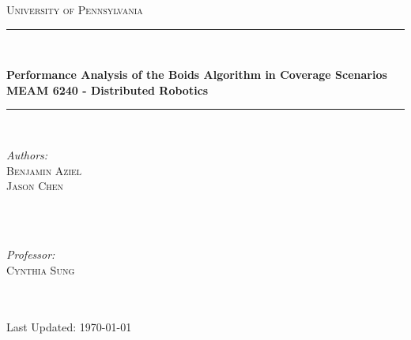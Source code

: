 \documentclass[12pt]{article}
\begin{document}

\thispagestyle{empty}
\newcommand{\titleName}{Performance Analysis of the Boids Algorithm in Coverage Scenarios\\[.4cm]
\textmd{\LARGE MEAM 6240 - Distributed Robotics}}
\begin{titlepage} 
	\newcommand{\HRule}{\rule{\linewidth}{0.5mm}}
	\center
	\textsc{\LARGE University of Pennsylvania}\\[2.5cm] 
	{\color{black} \HRule\\[0.4cm]}
	{\huge\bfseries \titleName}\\[0.4cm] 
	{\color{black} \HRule\\[0.4cm]}
	\begin{minipage}{0.4\textwidth}
		\begin{flushleft}
			\large
			\textit{Authors:}\\
            \textsc{Benjamin Aziel} \\
            \textsc{Jason Chen}\\
            \text{ }\\
		\end{flushleft}
	\end{minipage}
	~
	\begin{minipage}{0.4\textwidth}
		\begin{flushright}
			\large
			\textit{Professor:}\\
			\textsc{Cynthia Sung}\\ 
            \text{ }\\
            \text{ }\\
		\end{flushright}
	\end{minipage}
	\vfill

    \vfill
	{\large Last Updated: \today}
	\vfill
\end{titlepage}


\thispagestyle{tocstyle}
\tableofcontents
{}
\pagebreak

\abovedisplayskip=6pt
\belowdisplayskip=0pt
\abovedisplayshortskip=0pt
\belowdisplayshortskip=0pt

\setcounter{page}{1}
\end{document}
